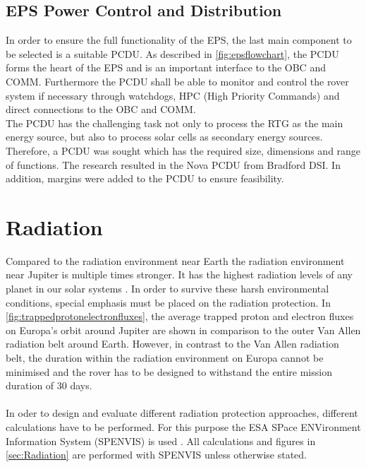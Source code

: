 \subsection{EPS Power Control and Distribution}
In order to ensure the full functionality of the EPS, the last main component to be selected is a suitable PCDU. As described in \autoref{fig:epsflowchart}, the PCDU forms the heart of the EPS and is an important interface to the OBC and COMM. Furthermore the PCDU shall be able to monitor and control the rover system if necessary through watchdogs, HPC (High Priority Commands) and direct connections to the OBC and COMM.\\
The PCDU has the challenging task not only to process the RTG as the main energy source, but also to process solar cells as secondary energy sources. Therefore, a PCDU was sought which has the required size, dimensions and range of functions. The research resulted in the Nova PCDU from Bradford DSI. In addition, margins were added to the PCDU to ensure feasibility\cite{BradfordSpace.2019}.

\clearpage
\section{Radiation} \label{sec:Radiation}

Compared to the radiation environment near Earth the radiation environment near Jupiter is multiple times stronger. It has the highest radiation levels of any planet in our solar systems \cite{Platzhalter}. In order to survive these harsh environmental conditions, special emphasis must be placed on the radiation protection. In \autoref{fig:trappedprotonelectronfluxes}, the average trapped proton and electron fluxes on Europa's orbit around Jupiter are shown in comparison to the outer Van Allen radiation belt around Earth. However, in contrast to the Van Allen radiation belt, the duration within the radiation environment on Europa cannot be minimised and the rover has to be designed to withstand the entire mission duration of 30 days. \\ \\
In oder to design and evaluate different radiation protection approaches, different calculations have to be performed. For this purpose the ESA SPace ENVironment Information System (SPENVIS) is used \cite{Platzhalter}. All calculations and figures in \autoref{sec:Radiation} are performed with SPENVIS unless otherwise stated.

